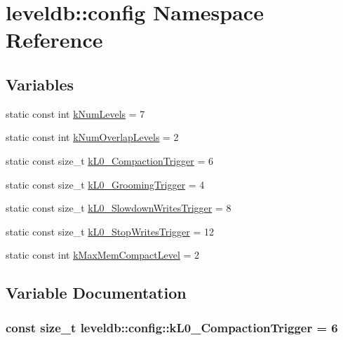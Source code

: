 \hypertarget{namespaceleveldb_1_1config}{}\section{leveldb\+:\+:config Namespace Reference}
\label{namespaceleveldb_1_1config}
\subsection*{Variables}
\begin{DoxyCompactItemize}
\item 
static const int \hyperlink{namespaceleveldb_1_1config_ab6017947ae68898c606643bddc0f5b9c}{k\+Num\+Levels} = 7
\item 
static const int \hyperlink{namespaceleveldb_1_1config_a2556583ad0dfeadde17d316691517276}{k\+Num\+Overlap\+Levels} = 2
\item 
static const size\+\_\+t \hyperlink{namespaceleveldb_1_1config_a9faf8ce56eb77b8a5f94eb4d4dc779e1}{k\+L0\+\_\+\+Compaction\+Trigger} = 6
\item 
static const size\+\_\+t \hyperlink{namespaceleveldb_1_1config_a6bbd60f6750bcbfc6627c19891953f57}{k\+L0\+\_\+\+Grooming\+Trigger} = 4
\item 
static const size\+\_\+t \hyperlink{namespaceleveldb_1_1config_a94458f275a1816dd8d10d0fbc7ea9a7e}{k\+L0\+\_\+\+Slowdown\+Writes\+Trigger} = 8
\item 
static const size\+\_\+t \hyperlink{namespaceleveldb_1_1config_a2b5f79087b67cae318ca0294e3b02e61}{k\+L0\+\_\+\+Stop\+Writes\+Trigger} = 12
\item 
static const int \hyperlink{namespaceleveldb_1_1config_a430b64b6904a624a515357cdfadba700}{k\+Max\+Mem\+Compact\+Level} = 2
\end{DoxyCompactItemize}


\subsection{Variable Documentation}
\hypertarget{namespaceleveldb_1_1config_a9faf8ce56eb77b8a5f94eb4d4dc779e1}{}
\subsubsection[{k\+L0\+\_\+\+Compaction\+Trigger}]{\setlength{\rightskip}{0pt plus 5cm}const size\+\_\+t leveldb\+::config\+::k\+L0\+\_\+\+Compaction\+Trigger = 6\hspace{0.3cm}{\ttfamily [static]}}\label{namespaceleveldb_1_1config_a9faf8ce56eb77b8a5f94eb4d4dc779e1}
\hypertarget{namespaceleveldb_1_1config_a6bbd60f6750bcbfc6627c19891953f57}{}
